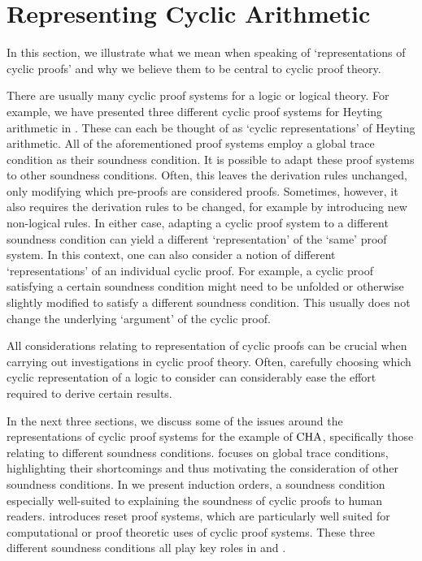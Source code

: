 
\chapter{Representing Cyclic Arithmetic}
\label{chap:representation}

In this section, we illustrate what we mean when speaking of
`representations of cyclic proofs' and why we believe them to be central to
cyclic proof theory.

There are usually many cyclic proof systems for a logic or logical theory. For
example, we have presented three different
cyclic proof systems for Heyting arithmetic in .
These can each be thought of as
`cyclic representations' of Heyting arithmetic. All of the aforementioned proof
systems employ a global trace condition as their soundness condition. It is
possible to
adapt these proof systems to other soundness conditions. Often,
this leaves the derivation rules unchanged, only modifying which pre-proofs are
considered proofs. Sometimes, however, it also requires the derivation rules to be
changed, for example by introducing new non-logical rules. In either case,
adapting a cyclic proof system to a different soundness
condition can yield a different `representation' of the `same' proof system.
In this context, one can also consider a notion of different `representations'
of an individual cyclic proof. For example, a cyclic proof satisfying a certain
soundness condition might need to be unfolded or otherwise slightly modified to
satisfy a different soundness condition. This usually does not change the underlying
`argument' of the cyclic proof.

All considerations relating to representation of cyclic proofs can be
crucial when carrying out investigations in cyclic proof theory. Often,
carefully choosing which cyclic representation of a logic to consider can
considerably ease the effort required to derive certain results.

In the next three sections, we discuss some of the issues around the
representations of cyclic proof systems for the example of $\mathrm{CHA}$, specifically
those relating to different
soundness conditions.  focuses on global trace
conditions, highlighting their shortcomings and thus motivating the
consideration of other soundness conditions. In  we present
induction orders, a soundness condition especially well-suited to explaining the
soundness of cyclic proofs to human readers.
 introduces reset proof systems, which
are particularly well suited for computational or proof theoretic uses of cyclic
proof systems. These three different soundness conditions all play key
roles in \papOne{} and \papTwo{}.

